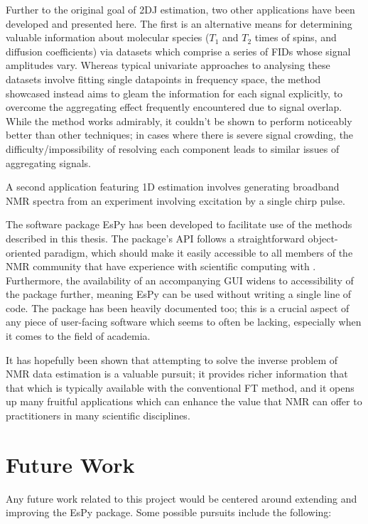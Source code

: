 Further to the original goal of \ac{2DJ} estimation, two other applications
have been developed and presented here. The first is an alternative means for
determining valuable information about molecular species ($T_1$ and  $T_2$
times of spins, and diffusion coefficients) via datasets which comprise a series
of \acp{FID} whose signal amplitudes vary. Whereas typical univariate
approaches to analysing these datasets involve fitting single datapoints in
frequency space, the method showcased instead aims to gleam the
information for each signal explicitly, to overcome the aggregating effect
frequently encountered due to signal overlap. While the method works admirably,
it couldn't be shown to perform noticeably better than other techniques; in
cases where there is severe signal crowding, the difficulty/impossibility of
resolving each component leads to similar issues of aggregating signals.

A second application featuring \ac{1D} estimation involves generating broadband
\ac{NMR} spectra from an experiment involving excitation by a single chirp
pulse. 

The software package \ac{EsPy} has been developed to facilitate use of the methods
described in this thesis. The package's \ac{API} follows a straightforward
object-oriented paradigm, which should make it easily accessible to all
members of the \ac{NMR} community that have experience with scientific
computing with \Python\!. Furthermore, the availability of an accompanying \ac{GUI}
widens to accessibility of the package further, meaning \ac{EsPy} can be used
without writing a single line of code. The package has been heavily documented
too; this is a crucial aspect of any piece of user-facing software which seems
to often be lacking, especially when it comes to the field of academia.


It has hopefully been shown that attempting to solve the inverse problem of
\ac{NMR} data estimation is a valuable pursuit; it provides richer information
that that which is typically available with the conventional \ac{FT} method,
and it opens up many fruitful applications which can enhance the value that
\ac{NMR} can offer to practitioners in many scientific disciplines.


\section{Future Work}
\label{sec:future-work}
Any future work related to this project would be centered around extending and
improving the \ac{EsPy} package. Some possible pursuits include the following:

